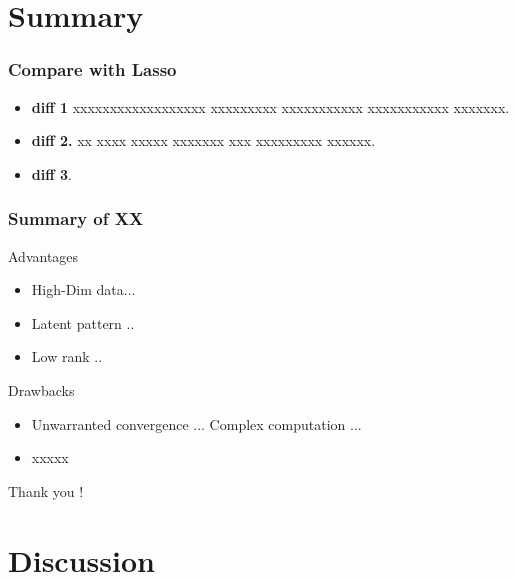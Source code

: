 \section{Summary}
\begin{frame}
\sectionpage
\end{frame}

\begin{frame}
    \frametitle{Compare with Lasso}
    \begin{itemize}
        \item \textbf{diff 1} xxxxxxxxxxxxxxxxxx xxxxxxxxx xxxxxxxxxxx xxxxxxxxxxx xxxxxxx.
        \item \textbf{diff 2.} xx xxxx xxxxx xxxxxxx xxx xxxxxxxxx xxxxxx.
        \item \textbf{diff 3}.
    \end{itemize}

\end{frame}

\begin{frame}
    \frametitle{Summary of XX}
    \begin{block}{Advantages}
        \begin{itemize}
        \item High-Dim data...
        \item Latent pattern ..
        \item Low rank ..
        \end{itemize}
    \end{block}
\end{frame}

\begin{frame}
    \begin{block}{Drawbacks}
        \begin{itemize}
            \item Unwarranted convergence ... Complex computation ... 
            \item xxxxx
        \end{itemize}
    \end{block}

    \vspace{24pt}

\begin{flushright}
    Thank you !
\end{flushright}
\end{frame}

\section{Discussion}
\begin{frame}    
\sectionpage
\end{frame}